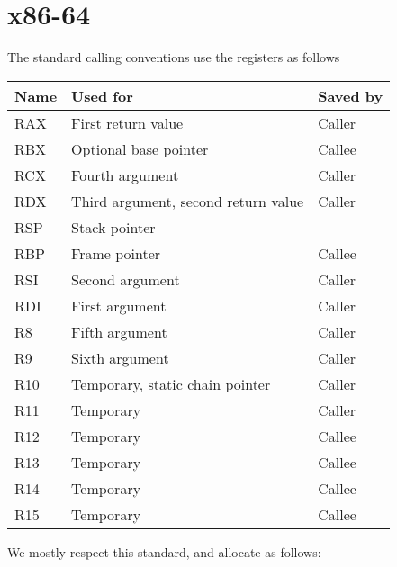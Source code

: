 \chapter{x86-64}
\label{chapter-backend-x86-64}

The standard calling conventions use the registers as follows

\begin{tabular}{|l|l|l|}
\hline
Name & Used for & Saved by\\
\hline
\hline
RAX & First return value & Caller\\
RBX & Optional base pointer & Callee\\
RCX & Fourth argument & Caller \\
RDX & Third argument, second return value & Caller\\
RSP & Stack pointer &\\
RBP & Frame pointer & Callee\\
RSI & Second argument & Caller\\
RDI & First argument & Caller\\
R8 & Fifth argument & Caller\\
R9 & Sixth argument & Caller\\
R10 & Temporary, static chain pointer & Caller\\
R11 & Temporary & Caller\\
R12 & Temporary & Callee\\
R13 & Temporary & Callee\\
R14 & Temporary & Callee\\
R15 & Temporary & Callee\\
\hline
\end{tabular}

We mostly respect this standard, and allocate as follows:

